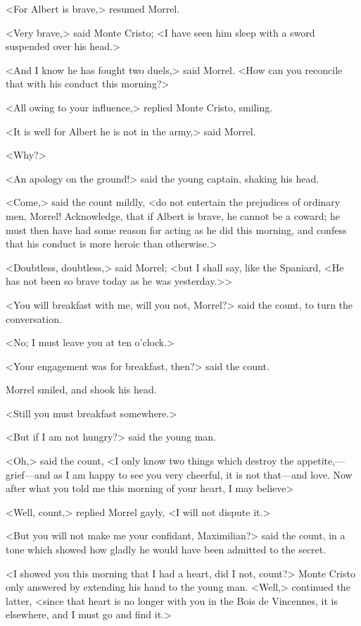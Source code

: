  <For Albert is brave,> resumed Morrel. 

 <Very brave,> said Monte Cristo; <I have seen him sleep with a sword suspended over his head.> 

 <And I know he has fought two duels,> said Morrel. <How can you reconcile that with his conduct this morning?> 

 <All owing to your influence,> replied Monte Cristo, smiling. 

 <It is well for Albert he is not in the army,> said Morrel. 

 <Why?> 

 <An apology on the ground!> said the young captain, shaking his head. 

 <Come,> said the count mildly, <do not entertain the prejudices of ordinary men, Morrel! Acknowledge, that if Albert is brave, he cannot be a coward; he must then have had some reason for acting as he did this morning, and confess that his conduct is more heroic than otherwise.> 

 <Doubtless, doubtless,> said Morrel; <but I shall say, like the Spaniard, <He has not been so brave today as he was yesterday.>> 

 <You will breakfast with me, will you not, Morrel?> said the count, to turn the conversation. 

 <No; I must leave you at ten o'clock.> 

 <Your engagement was for breakfast, then?> said the count. 

 Morrel smiled, and shook his head. 

 <Still you must breakfast somewhere.> 

 <But if I am not hungry?> said the young man. 

 <Oh,> said the count, <I only know two things which destroy the appetite,—grief—and as I am happy to see you very cheerful, it is not that—and love. Now after what you told me this morning of your heart, I may believe\longdash> 

 <Well, count,> replied Morrel gayly, <I will not dispute it.> 

 <But you will not make me your confidant, Maximilian?> said the count, in a tone which showed how gladly he would have been admitted to the secret. 

 <I showed you this morning that I had a heart, did I not, count?> Monte Cristo only answered by extending his hand to the young man. <Well,> continued the latter, <since that heart is no longer with you in the Bois de Vincennes, it is elsewhere, and I must go and find it.> 


